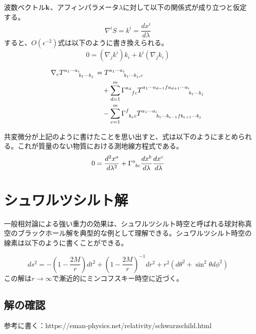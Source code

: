 \documentclass[dvipdfmx]{report} %
\begin{document}
波数ベクトル$\bold{k}$、アフィンパラメータ$\lambda$に対して以下の関係式が成り立つと仮定する。
\[ \nabla^i S = k^i = \frac{d x^i}{d\lambda} \]
すると、$O(\epsilon^{-2})$式は以下のように書き換えられる。
\[
	0 = (\nabla_j k^i)k_i + k^i(\nabla_j k_i)
\]
\begin{tcolorbox}[title=一般のテンソルに対する共変微分]
\begin{equation*}
\begin{split}
	\nabla_c \tensor{T}{^{a_1 \cdots a_i}_{b_1 \cdots b_j}}  
	&=
		\tensor{T}{^{a_1 \cdots a_i}_{b_1 \cdots b_j, c}}\\
	&\quad
		+ \sum^{m}_{d=1}
		\tensor{\Gamma}{^{a_d}_{fc}}
		\tensor{T}{^{a_1 \cdots a_{d-1} f a_{d+1} \cdots a_i}_{b_1 \cdots b_j}}\\
	&\quad
		- \sum^{m}_{e=1}
		\tensor{\Gamma}{^{f}_{b_e c}}
		\tensor{T}{^{a_1 \cdots a_i}_{b_1 \cdots b_{e-1} f b_{e+1} \cdots b_j}}\\
\end{split}
\end{equation*}
\end{tcolorbox}
共変微分が上記のように書けたことを思い出すと、式は以下のようにまとめられる。これが質量のない物質における測地線方程式である。
\[
0 = \frac{d^2 x^a}{d \lambda^2} + \tensor{\Gamma}{^{a}_{bc}}\frac{dx^b}{d\lambda}\frac{dx^c}{d\lambda}
\]

\chapter{シュワルツシルト解}
一般相対論による強い重力の効果は、シュワルツシルト時空と呼ばれる球対称真空のブラックホール解を典型的な例として理解できる。シュワルツシルト時空の線素は以下のように書くことができる。

\[
ds^2 =
		-\left( 1 - \frac{2M}{r} \right)dt^2
		+ \left( 1 - \frac{2M}{r} \right)^{-1}dr^2
		+ r^2( d\theta^2 + \sin^2\theta d\phi^2 )
\]
この解は$r \rightarrow \infty$で漸近的にミンコフスキー時空に近づく。

\section{解の確認}
参考に書く：https://eman-physics.net/relativity/schwarzschild.html 
\end{document}
